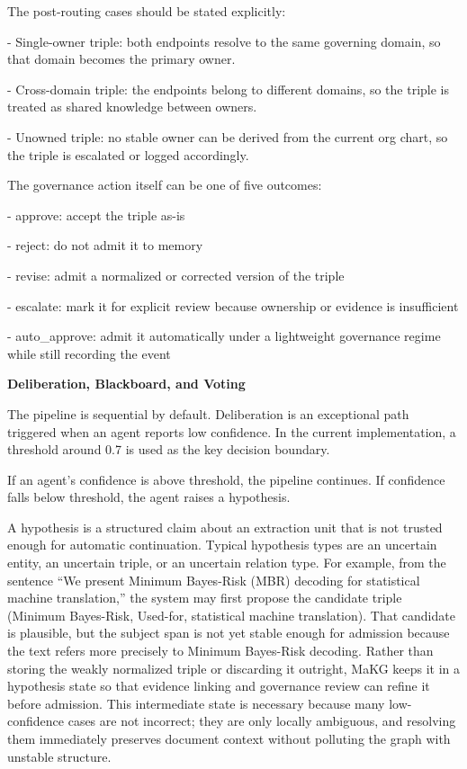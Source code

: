 The post-routing cases should be stated explicitly:

- Single-owner triple: both endpoints resolve to the same governing
domain, so that domain becomes the primary owner.

- Cross-domain triple: the endpoints belong to different domains, so the
triple is treated as shared knowledge between owners.

- Unowned triple: no stable owner can be derived from the current org
chart, so the triple is escalated or logged accordingly.

The governance action itself can be one of five outcomes:

- approve: accept the triple as-is

- reject: do not admit it to memory

- revise: admit a normalized or corrected version of the triple

- escalate: mark it for explicit review because ownership or evidence is
insufficient

- auto\_approve: admit it automatically under a lightweight governance
regime while still recording the event

\textbf{Deliberation, Blackboard, and Voting}

The pipeline is sequential by default. Deliberation is an exceptional
path triggered when an agent reports low confidence. In the current
implementation, a threshold around 0.7 is used as the key decision
boundary.

If an agent's confidence is above threshold, the pipeline continues. If
confidence falls below threshold, the agent raises a hypothesis.

A hypothesis is a structured claim about an extraction unit that is not
trusted enough for automatic continuation. Typical hypothesis types are
an uncertain entity, an uncertain triple, or an uncertain relation type.
For example, from the sentence ``We present Minimum Bayes-Risk (MBR)
decoding for statistical machine translation,'' the system may first
propose the candidate triple (Minimum Bayes-Risk, Used-for, statistical
machine translation). That candidate is plausible, but the subject span
is not yet stable enough for admission because the text refers more
precisely to Minimum Bayes-Risk decoding. Rather than storing the weakly
normalized triple or discarding it outright, MaKG keeps it in a
hypothesis state so that evidence linking and governance review can
refine it before admission. This intermediate state is necessary because
many low-confidence cases are not incorrect; they are only locally
ambiguous, and resolving them immediately preserves document context
without polluting the graph with unstable structure.

